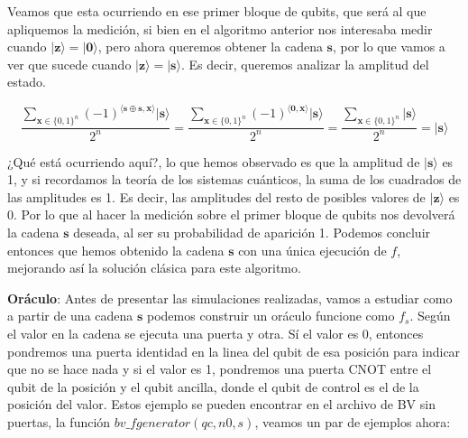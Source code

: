  \vspace{10pt}

 Veamos que esta ocurriendo en ese primer bloque de qubits, que será al que apliquemos la medición, si bien en el algoritmo anterior nos interesaba medir cuando $|\mathbf{z}\rangle=|\mathbf{0}\rangle$, pero ahora queremos obtener la cadena $\mathbf{s}$, por lo que vamos a ver que sucede cuando $|\mathbf{z}\rangle=|\mathbf{s}\rangle$. Es decir, queremos analizar la amplitud del estado.

 \begin{equation}
    \dfrac{\sum_{\mathbf{x} \in \{0,1\}^{n}}(-1)^{\langle\mathbf{s}\oplus \mathbf{s},\mathbf{x}\rangle}|\mathbf{s}\rangle}{2^{n}} = \dfrac{\sum_{\mathbf{x} \in \{0,1\}^{n}}(-1)^{\langle\mathbf{0},\mathbf{x}\rangle}|\mathbf{s}\rangle}{2^{n}}= \dfrac{\sum_{\mathbf{x} \in \{0,1\}^{n}}|\mathbf{s}\rangle}{2^{n}} = |\mathbf{s}\rangle
 \end{equation}

 \vspace{3pt}

 ¿Qué está ocurriendo aquí?, lo que hemos observado es que la amplitud de $|\mathbf{s}\rangle$ es 1, y si recordamos la teoría de los sistemas cuánticos, la suma de los cuadrados de las amplitudes es 1. Es decir, las amplitudes del resto de posibles valores de $|\mathbf{z}\rangle$ es 0. Por lo que al hacer la medición sobre el primer bloque de qubits nos devolverá la cadena $\mathbf{s}$ deseada, al ser su probabilidad de aparición 1. Podemos concluir entonces que hemos obtenido la cadena $\mathbf{s}$ con una única ejecución de $f$, mejorando así la solución clásica para este algoritmo.

 \vspace{7pt}

 \textbf{Oráculo}: Antes de presentar las simulaciones realizadas, vamos a estudiar como a partir de una cadena $\mathbf{s}$ podemos construir un oráculo funcione como $f_{s}$. Según el valor en la cadena se ejecuta una puerta y otra. Sí el valor es 0, entonces pondremos una puerta identidad en la linea del qubit de esa posición para indicar que no se hace nada y si el valor es 1, pondremos una puerta CNOT entre el qubit de la posición y el qubit ancilla, donde el qubit de control es el de la posición del valor. Estos ejemplo se pueden encontrar en el archivo de BV sin puertas, la función \textit{$bv\_fgenerator(qc,n0,s)$}, veamos un par de ejemplos ahora:
 
